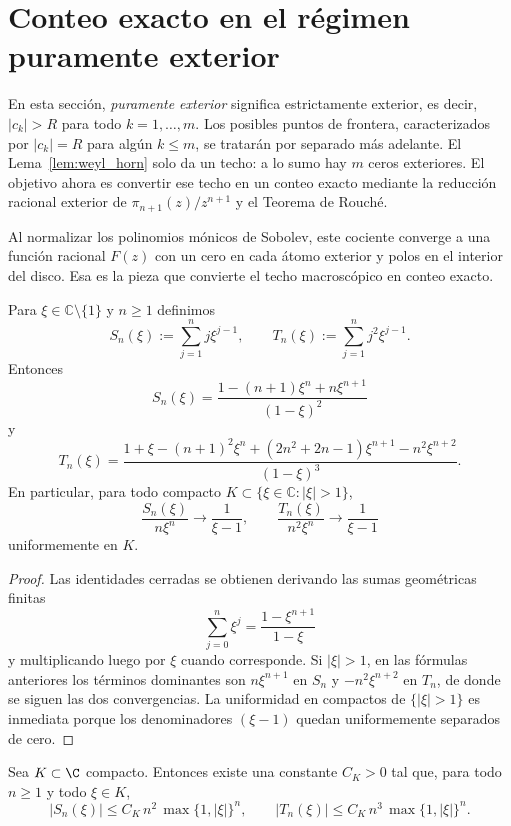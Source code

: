 \section{Conteo exacto en el régimen puramente exterior}\label{sec:conteo_ceros}

En esta sección, \emph{puramente exterior} significa estrictamente exterior, es decir, $|c_k|>R$ para todo $k=1,\dots,m$. Los posibles puntos de frontera, caracterizados por $|c_k|=R$ para algún $k\le m$, se tratarán por separado más adelante. El Lema~\ref{lem:weyl_horn} solo da un techo: a lo sumo hay $m$ ceros exteriores. El objetivo ahora es convertir ese techo en un conteo exacto mediante la reducción racional exterior de $\pi_{n+1}(z)/z^{n+1}$ y el Teorema de Rouché.

Al normalizar los polinomios mónicos de Sobolev, este cociente converge a una función racional $F(z)$ con un cero en cada átomo exterior y polos en el interior del disco. Esa es la pieza que convierte el techo macroscópico en conteo exacto.

\begin{lem}\label{lem:sumas_geometricas_ponderadas}
	Para $\xi\in\mathbb C\setminus\{1\}$ y $n\ge1$ definimos
	\[
		S_n(\xi):=\sum_{j=1}^n j\xi^{j-1},
		\qquad
		T_n(\xi):=\sum_{j=1}^n j^2\xi^{j-1}.
	\]
	Entonces
	\[
		S_n(\xi)=\frac{1-(n+1)\xi^n+n\xi^{n+1}}{(1-\xi)^2}
	\]
	y
	\[
		T_n(\xi)=\frac{1+\xi-(n+1)^2\xi^n+(2n^2+2n-1)\xi^{n+1}-n^2\xi^{n+2}}{(1-\xi)^3}.
	\]
	En particular, para todo compacto $K\subset\{\xi\in\mathbb C:|\xi|>1\}$,
	\[
		\frac{S_n(\xi)}{n\xi^n}\longrightarrow \frac{1}{\xi-1},
		\qquad
		\frac{T_n(\xi)}{n^2\xi^n}\longrightarrow \frac{1}{\xi-1}
	\]
	uniformemente en $K$.
\end{lem}

\begin{proof}
	Las identidades cerradas se obtienen derivando las sumas geométricas finitas
	\[
		\sum_{j=0}^n \xi^j=\frac{1-\xi^{n+1}}{1-\xi}
	\]
	y multiplicando luego por $\xi$ cuando corresponde. Si $|\xi|>1$, en las fórmulas anteriores los términos dominantes son $n\xi^{n+1}$ en $S_n$ y $-n^2\xi^{n+2}$ en $T_n$, de donde se siguen las dos convergencias. La uniformidad en compactos de $\{|\xi|>1\}$ es inmediata porque los denominadores $(\xi-1)$ quedan uniformemente separados de cero.
\end{proof}

\begin{lem}\label{lem:cotas_sumas_geometricas_ponderadas}
	Sea $K\subset\C$ compacto. Entonces existe una constante $C_K>0$ tal que, para todo $n\ge1$ y todo $\xi\in K$,
	\[
		|S_n(\xi)|\le C_K\,n^2\,\max\{1,|\xi|\}^n,
		\qquad
		|T_n(\xi)|\le C_K\,n^3\,\max\{1,|\xi|\}^n.
	\]
\end{lem}

